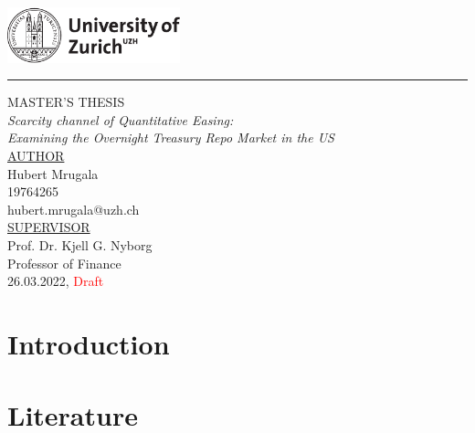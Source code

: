 \documentclass[12pt]{article}
\begin{document}
\begin{titlepage}
  \noindent\includegraphics[width=5cm]{uzh_logo_e_pos.pdf}
  \noindent\rule{\textwidth}{0.4pt}
  \vspace{1cm}
  \begin{center}
    \LARGE MASTER'S THESIS \\
    \vspace{1cm}
    {\Large \emph{Scarcity channel of Quantitative Easing:\\
    Examining the Overnight Treasury Repo Market in the US \\}}
    \vspace{2cm}
    {\large \underline{AUTHOR} \\} 
    \vspace{0.3cm}
    {\LARGE Hubert Mrugala \\}
    \vspace{0.3cm}
    {\large 19764265 \\}
    \vspace{0.3cm}
    {\large hubert.mrugala@uzh.ch \\}
    \vspace{2cm}
    {\large \underline{SUPERVISOR} \\} 
    \vspace{0.3cm}
    {\LARGE Prof. Dr. Kjell G. Nyborg\\}
    \vspace{0.3cm}
    {\large Professor of Finance \\}
    \vspace{4 cm}
    {\large 26.03.2022, \textcolor{red}{Draft}}
  \end{center}
\end{titlepage}

\tableofcontents
\newpage


\section{Introduction}

\section{Literature}
\end{document}
